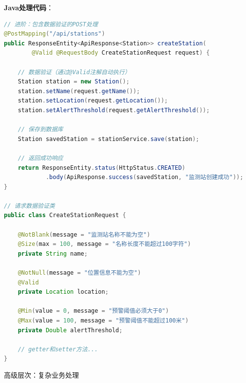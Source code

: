 \textbf{Java处理代码}：

\begin{lstlisting}[language=Java]
// 进阶：包含数据验证的POST处理
@PostMapping("/api/stations")
public ResponseEntity<ApiResponse<Station>> createStation(
        @Valid @RequestBody CreateStationRequest request) {
    
    // 数据验证（通过@Valid注解自动执行）
    Station station = new Station();
    station.setName(request.getName());
    station.setLocation(request.getLocation());
    station.setAlertThreshold(request.getAlertThreshold());
    
    // 保存到数据库
    Station savedStation = stationService.save(station);
    
    // 返回成功响应
    return ResponseEntity.status(HttpStatus.CREATED)
            .body(ApiResponse.success(savedStation, "监测站创建成功"));
}

// 请求数据验证类
public class CreateStationRequest {
    
    @NotBlank(message = "监测站名称不能为空")
    @Size(max = 100, message = "名称长度不能超过100字符")
    private String name;
    
    @NotNull(message = "位置信息不能为空")
    @Valid
    private Location location;
    
    @Min(value = 0, message = "预警阈值必须大于0")
    @Max(value = 100, message = "预警阈值不能超过100米")
    private Double alertThreshold;
    
    // getter和setter方法...
}
\end{lstlisting}

 高级层次：复杂业务处理

